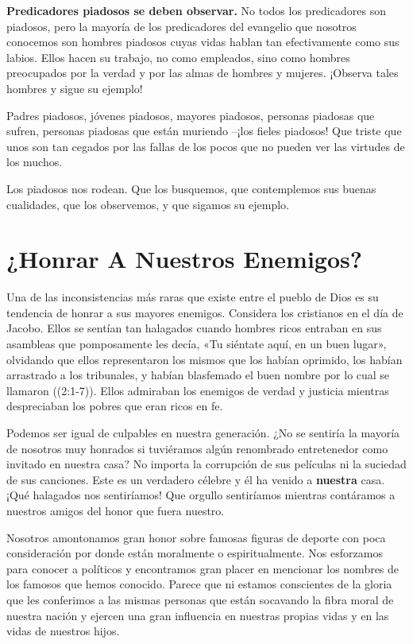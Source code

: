 \documentclass[12pt, twoside, openright]{book}
\begin{document}
\textbf{Predicadores piadosos se deben observar.} No todos los predicadores son piadosos, pero la mayoría de los predicadores del evangelio que nosotros conocemos son hombres piadosos cuyas vidas hablan tan efectivamente como sus labios. Ellos hacen su trabajo, no como empleados, sino como hombres preocupados por la verdad y por las almas de hombres y mujeres. ¡Observa tales hombres y sigue su ejemplo!

Padres piadosos, jóvenes piadosos, mayores piadosos, personas piadosas que sufren, personas piadosas que están muriendo –¡los fieles piadosos! Que triste que unos son tan cegados por las fallas de los pocos que no pueden ver las virtudes de los muchos.

Los piadosos nos rodean. Que los busquemos, que contemplemos sus buenas cualidades, que los observemos, y que sigamos su ejemplo.

\section{¿Honrar A Nuestros Enemigos?}
Una de las inconsistencias más raras que existe entre el pueblo de Dios es su tendencia de honrar a sus mayores enemigos. Considera los cristianos en el día de Jacobo. Ellos se sentían tan halagados cuando hombres ricos entraban en sus asambleas que pomposamente les decía, «Tu siéntate aquí, en un buen lugar», olvidando que ellos representaron los mismos que los habían oprimido, los habían arrastrado a los tribunales, y habían blasfemado el buen nombre por lo cual se llamaron ((2:1-7)). Ellos admiraban los enemigos de verdad y justicia mientras despreciaban los pobres que eran ricos en fe. 

Podemos ser igual de culpables en nuestra generación. ¿No se sentiría la mayoría de nosotros muy honrados si tuviéramos algún renombrado entretenedor como invitado en nuestra casa? No importa la corrupción de sus películas ni la suciedad de sus canciones. Este es un verdadero célebre y él ha venido a \textbf{nuestra} casa. ¡Qué halagados nos sentiríamos! Que orgullo sentiríamos mientras contáramos a nuestros amigos del honor que fuera nuestro.

Nosotros amontonamos gran honor sobre famosas figuras de deporte con poca consideración por donde están moralmente o espiritualmente. Nos esforzamos para conocer a políticos y encontramos gran placer en mencionar los nombres de los famosos que hemos conocido. Parece que ni estamos conscientes de la gloria que les conferimos a las mismas personas que están socavando la fibra moral de nuestra nación y ejercen una gran influencia en nuestras propias vidas y en las vidas de nuestros hijos.
\end{document}
